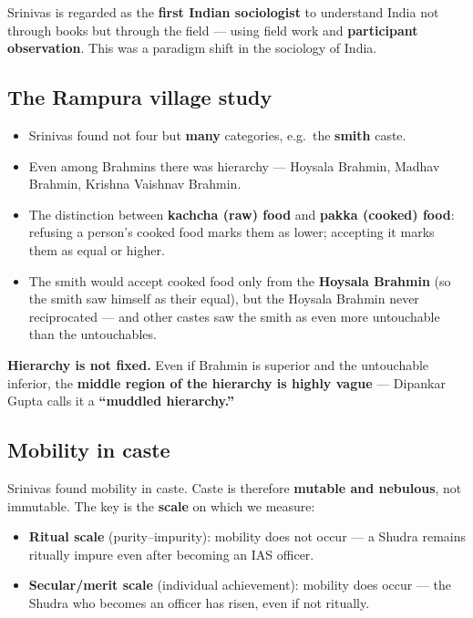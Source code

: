 Srinivas is regarded as the \textbf{first Indian sociologist} to understand India not through books but through the field --- using field work and \textbf{participant observation}. This was a paradigm shift in the sociology of India.

\subsection{The Rampura village study}

\begin{itemize}
\item Srinivas found not four but \textbf{many} categories, e.g.\ the \textbf{smith} caste.
\item Even among Brahmins there was hierarchy --- Hoysala Brahmin, Madhav Brahmin, Krishna Vaishnav Brahmin.
\item The distinction between \textbf{kachcha (raw) food} and \textbf{pakka (cooked) food}: refusing a person's cooked food marks them as lower; accepting it marks them as equal or higher.
\item The smith would accept cooked food only from the \textbf{Hoysala Brahmin} (so the smith saw himself as their equal), but the Hoysala Brahmin never reciprocated --- and other castes saw the smith as even more untouchable than the untouchables.
\end{itemize}

\begin{KeyConcept}
\textbf{Hierarchy is not fixed.} Even if Brahmin is superior and the untouchable inferior, the \textbf{middle region of the hierarchy is highly vague} --- Dipankar Gupta calls it a \textbf{``muddled hierarchy.''}
\end{KeyConcept}

\subsection{Mobility in caste}

Srinivas found mobility in caste. Caste is therefore \textbf{mutable and nebulous}, not immutable. The key is the \textbf{scale} on which we measure:

\begin{ComparisonBox}
\begin{itemize}
\item \textbf{Ritual scale} (purity--impurity): mobility does not occur --- a Shudra remains ritually impure even after becoming an IAS officer.
\item \textbf{Secular/merit scale} (individual achievement): mobility does occur --- the Shudra who becomes an officer has risen, even if not ritually.
\end{itemize}
\end{ComparisonBox}

